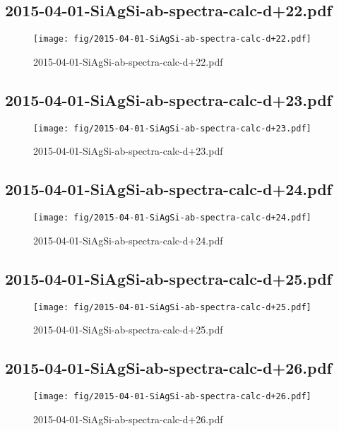 \documentclass[fullscreen=true]{beamer}
\begin{document}
\subsection{2015-04-01-SiAgSi-ab-spectra-calc-d+22.pdf}
\begin{frame}
  \begin{figure}
    \texttt{[image: fig/2015-04-01-SiAgSi-ab-spectra-calc-d+22.pdf]}%
    \caption{2015-04-01-SiAgSi-ab-spectra-calc-d+22.pdf}
  \end{figure}
\end{frame}

\subsection{2015-04-01-SiAgSi-ab-spectra-calc-d+23.pdf}
\begin{frame}
  \begin{figure}
    \texttt{[image: fig/2015-04-01-SiAgSi-ab-spectra-calc-d+23.pdf]}%
    \caption{2015-04-01-SiAgSi-ab-spectra-calc-d+23.pdf}
  \end{figure}
\end{frame}

\subsection{2015-04-01-SiAgSi-ab-spectra-calc-d+24.pdf}
\begin{frame}
  \begin{figure}
    \texttt{[image: fig/2015-04-01-SiAgSi-ab-spectra-calc-d+24.pdf]}%
    \caption{2015-04-01-SiAgSi-ab-spectra-calc-d+24.pdf}
  \end{figure}
\end{frame}

\subsection{2015-04-01-SiAgSi-ab-spectra-calc-d+25.pdf}
\begin{frame}
  \begin{figure}
    \texttt{[image: fig/2015-04-01-SiAgSi-ab-spectra-calc-d+25.pdf]}%
    \caption{2015-04-01-SiAgSi-ab-spectra-calc-d+25.pdf}
  \end{figure}
\end{frame}

\subsection{2015-04-01-SiAgSi-ab-spectra-calc-d+26.pdf}
\begin{frame}
  \begin{figure}
    \texttt{[image: fig/2015-04-01-SiAgSi-ab-spectra-calc-d+26.pdf]}%
    \caption{2015-04-01-SiAgSi-ab-spectra-calc-d+26.pdf}
  \end{figure}
\end{frame}
\end{document}
